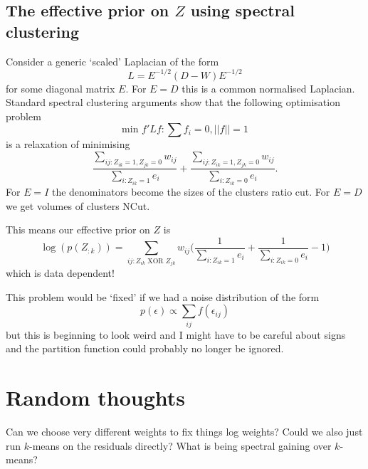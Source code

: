 \documentclass{article}
\numberwithin{equation}{section}
\numberwithin{thm}{section}
\def\IBP{Z}
\def\Adjacency{W}
\def\Degree{D}
\def\Laplacian{L}
\def\errors{\epsilon}
\begin{document}
\subsection{The effective prior on $\IBP$ using spectral clustering}
Consider a generic `scaled' Laplacian of the form
\begin{equation}
\Laplacian = E^{-1/2}(\Degree - \Adjacency)E^{-1/2}
\end{equation}
for some diagonal matrix $E$. For $E = \Degree$ this is a common normalised Laplacian.
Standard spectral clustering arguments show that the following optimisation problem
\begin{equation}
\textrm{min } f'\Laplacian f : \sum f_i = 0, ||f|| = 1
\end{equation}
is a relaxation of minimising
\begin{equation}
\frac{\sum_{ij: \IBP_{ik} = 1, \IBP_{jk} = 0}w_{ij}}{\sum_{i: \IBP_{ik} = 1}e_i} +  \frac{\sum_{ij: \IBP_{ik} = 1, \IBP_{jk} = 0}w_{ij}}{{\sum_{i: \IBP_{ik} = 0}e_i}}.
\end{equation}
For $E = I$ the denominators become the sizes of the clusters \ie ratio cut.
For $E = D$ we get volumes of clusters \ie NCut.

This means our effective prior on $\IBP$ is
\begin{equation}
\log(p(\IBP_{:k})) = \sum_{ij: \IBP_{ik} \textrm{ XOR } \IBP_{jk}}w_{ij}\Big(\frac{1}{\sum_{i: \IBP_{ik} = 1}e_i} + \frac{1}{\sum_{i: \IBP_{ik} = 0}e_i} - 1)
\end{equation}
which is data dependent!

This problem would be `fixed' if we had a noise distribution of the form
\begin{equation}
p(\errors) \propto \sum_{ij} f(\errors_{ij})
\end{equation}
but this is beginning to look weird and I might have to be careful about signs and the partition function could probably no longer be ignored.

\section{Random thoughts}

Can we choose very different weights to fix things \eg log weights?
Could we also just run $k$-means on the residuals directly?
What is being spectral gaining over $k$-means?
\end{document}
